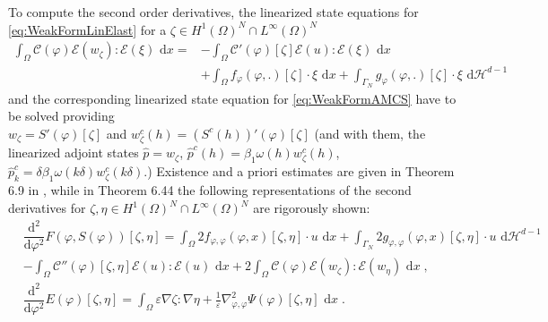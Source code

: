\documentclass[a4paper,11pt]{article}
\theoremstyle{remark}
\newcommand{\dx}{\text{ d}x}
\newcommand{\dH}{\text{ d}\mathcal{H}^{d-1}}
\newcommand{\intO}{\int_{\Omega}}
\newcommand{\intG}{\int_{\Gamma_{N}}}
\newcommand{\dphitwo}{\dfrac{\text{d}^2}{\text{d}\varphi^2}}
\newcommand{\HON}{H^1(\Omega)^N }
\newcommand{\LinfN}{L^\infty(\Omega)^N}
\begin{document}
To compute the second order derivatives, the linearized state equations for
\eqref{eq:WeakFormLinElast}
for a $\zeta\in\HON\cap\LinfN$
\begin{align}
\label{eq:LinMS}
\intO  \mathcal{C}(\varphi)\mathcal{E}(
w_{\zeta}):\mathcal{E}(\xi) \dx =
&- \intO \mathcal{C}'(\varphi)[\zeta]\mathcal{E}(u):\mathcal{E}(\xi) \dx\\
 &+ \intO f_{\varphi} (\varphi,.)[\zeta] \cdot \xi \dx + \intG g_{\varphi}(\varphi, .)[\zeta] \cdot \xi\dH
\; 
\nonumber
\end{align}
and the corresponding linearized state equation for
\eqref{eq:WeakFormAMCS}
have to be solved providing \\
$w_\zeta= S'(\varphi)[\zeta]$ and $w^c_\zeta(h)= (S^c(h))'(\varphi)[\zeta]$ (and with them, the linearized adjoint states $\hat p =w_\zeta$, $\hat p^c(h)= \beta_1\omega(h) w^c_\zeta(h)$, $\hat p^c_k= \delta \beta_1\omega(k\delta) w^c_\zeta(k\delta)$.)
%
Existence and a priori estimates are given in Theorem 6.9 in \cite{DissRupprecht}, while in Theorem 6.44 the following representations of the second derivatives for $\zeta,\eta\in\HON\cap\LinfN$ are rigorously shown:
\begin{align}
&\dphitwo F(\varphi, S(\varphi))[\zeta,\eta] 
= \intO 2 f_{\varphi,\varphi} (\varphi,x)[\zeta,\eta] \cdot u  \dx
+ \intG 2 g_{\varphi,\varphi}(\varphi,x)[\zeta,\eta] \cdot u \dH
\label{Fsec} \\
&- \intO \mathcal{C}''(\varphi)[\zeta,\eta]\mathcal{E}(u):\mathcal{E}(u) \dx
+ 2 \intO \mathcal{C}(\varphi)\mathcal{E}(w_\zeta):\mathcal{E}(w_\eta) \dx \; , \nonumber \\
&\dphitwo E(\varphi)[\zeta,\eta] 
= \intO \varepsilon \nabla\zeta : \nabla\eta + \tfrac{1}{\varepsilon} \nabla^2_{\varphi,\varphi} \Psi(\varphi) [\zeta,\eta]\dx  \; . \label{Esec}
\end{align}
\end{document}
